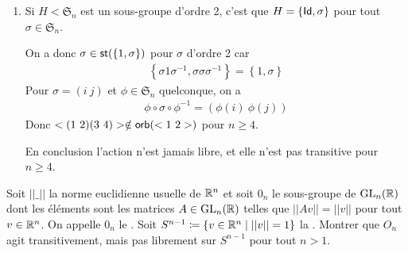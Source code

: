 \documentclass[french,a4paper,10pt]{article}
\begin{document}
\begin{td-sol}
\begin{enumerate}[label=$(\roman*)$]
\begin{rappel}
				\[\begin{aligned}
					\scr D_n&\to\mathfrak{S}_{\mu_n}\\
					R^j&\mapsto\left[\zeta^k\mapsto e^{\frac{2j\pi i}n}\zeta^k\right]\\
					R^jS&\mapsto\left[\zeta^k\mapsto e^{\frac{2j\pi i}n}\zeta^{-k}\right]
				\end{aligned}\]
			\end{rappel}
			
			L'action de $\scr D_n$ sur $\mu_n$ n'est pas libre car $S\in\st(1)$ et donc $S\cdot 1=\ol 1=1$.
			
			L'action est transitive car $\zeta^k=R^k\cdot 1\quad\forall \zeta^k\in\mu_n$.
			
			\item Si $H<\mathfrak{S}_n$ est un sous-groupe d'ordre 2, c'est que $H=\{\operatorname{\mathsf{Id}}, \sigma\}$ pour tout $\sigma\in \mathfrak{S}_n$.
			
			On a donc $\sigma\in\operatorname{\mathsf{st}}(\{1, \sigma\})$ pour $\sigma$ d'ordre 2 car
			\[\begin{aligned}
				\left\{\sigma 1\sigma^{-1},\sigma\sigma\sigma^{-1}\right\}=\left\{1, \sigma\right\}
			\end{aligned}\]
			Pour $\sigma = (i~j)$ et $\phi\in\mathfrak{S}_n$ quelconque, on a
			\[\begin{aligned}
				\phi\circ\sigma\circ\phi^{-1}=\left(\phi(i)~\phi(j)\right)
			\end{aligned}\]
			Donc $<(1~2)(3~4)>\notin\operatorname{\mathsf{orb}}(<1~2>)$ pour $n\ge 4$.
			
			En conclusion l'action n'est jamais libre, et elle n'est pas transitive pour $n\ge 4$.
		\end{enumerate}
	\end{td-sol}
	\medspace
	\begin{td-exo}
		Soit $||\_||$ la norme euclidienne usuelle de $\mathbb{R}^n$ et soit $0_n$ le sous-groupe de $\text{GL}_{n}(\mathbb{R})$ dont les éléments sont les matrices $A\in\text{GL}_{n}(\mathbb{R})$ telles que $||Av||=||v||$ pour tout $v\in\mathbb{R}^n$. On appelle $0_n$ le . Soit $S^{n-1}\coloneq \{v\in \mathbb{R}^n\mid||v||=1\}$ la . Montrer que $O_n$ agit transitivement, mais pas librement sur $S^{n-1}$ pour tout $n>1$.
	\end{td-exo}
	
\end{document}
